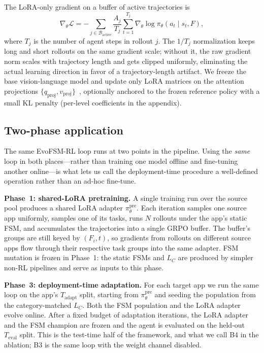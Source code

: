 The LoRA-only gradient on a buffer of active trajectories is
\begin{equation}
\nabla_\theta \mathcal{L} = -\sum_{j \in \mathcal{B}_{\text{active}}} \frac{A_j}{T_j} \sum_{t=1}^{T_j} \nabla_\theta \log \pi_\theta(a_t \mid s_t, F),
\label{eq:grpo-loss}
\end{equation}
where $T_j$ is the number of agent steps in rollout $j$. The $1/T_j$
normalization keeps long and short rollouts on the same gradient scale; without
it, the raw gradient norm scales with trajectory length and gets clipped
uniformly, eliminating the actual learning direction in favor of a
trajectory-length artifact. We freeze the base vision-language model and update
only LoRA matrices on the attention projections $\{q_{\text{proj}},
v_{\text{proj}}\}$~\citep{hu2021lora}, optionally anchored to the frozen
reference policy with a small KL penalty (per-level coefficients in the
appendix).

\subsection{Two-phase application}
\label{sec:method-phases}

The same EvoFSM-RL loop runs at two points in the pipeline. Using the
\emph{same} loop in both places---rather than training one model offline and
fine-tuning another online---is what lets us call the deployment-time procedure
a well-defined operation rather than an ad-hoc fine-tune.

\textbf{Phase~1: shared-LoRA pretraining.} A single training run over the source
pool produces a shared LoRA adapter $\pi^{\text{pre}}_\theta$. Each iteration
samples one source app uniformly, samples one of its tasks, runs $N$ rollouts
under the app's static FSM, and accumulates the trajectories into a single GRPO
buffer. The buffer's groups are still keyed by $(F_i, t)$, so gradients from
rollouts on different source apps flow through their respective task groups into
the same adapter. FSM mutation is frozen in Phase~1: the static FSMs and $L_C$
are produced by simpler non-RL pipelines and serve as inputs to this phase.

\textbf{Phase~3: deployment-time adaptation.} For each target app we run the same
loop on the app's $T_{\text{adapt}}$ split, starting from
$\pi^{\text{pre}}_\theta$ and seeding the population from the category-matched
$L_C$. Both the FSM population and the LoRA adapter evolve online. After a fixed
budget of adaptation iterations, the LoRA adapter and the FSM champion are
frozen and the agent is evaluated on the held-out $T_{\text{eval}}$ split. This
is the test-time half of the framework, and what we call B4 in the ablation; B3
is the same loop with the weight channel disabled.

